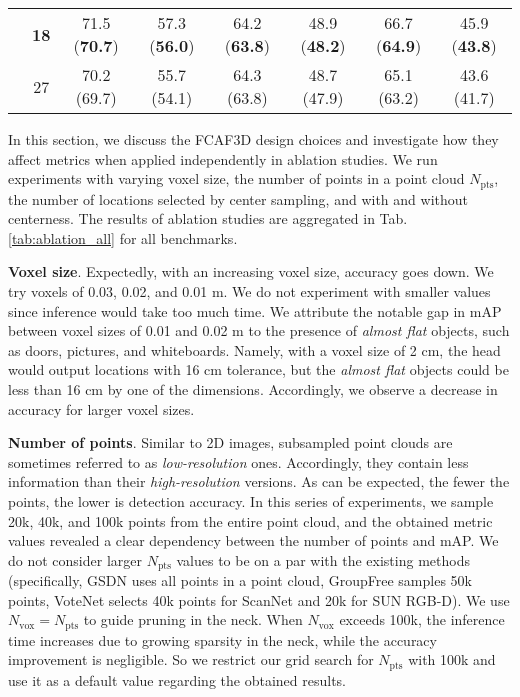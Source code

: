 \documentclass[runningheads]{llncs}
\begin{document}
\begin{table*}[ht!]
{\begin{tabular}{c|c|cccccc}
    & \textbf{18} & 71.5 (\textbf{70.7}) & 57.3 (\textbf{56.0}) & 64.2 (\textbf{63.8}) & 48.9 (\textbf{48.2}) & 66.7 (\textbf{64.9}) & 45.9 (\textbf{43.8}) \\
    & 27 & 70.2 (69.7) & 55.7 (54.1) & 64.3 (63.8) & 48.7 (47.9) & 65.1 (63.2) & 43.6 (41.7) \\ \hline
    \end{tabular}
    }
    \caption{Results of ablation studies on the voxel size, the number of points (which equals the number of voxels $N_{\text{vox}}$ in pruning), centerness, and center sampling in FCAF3D. The better options are marked bold (actually, these are the default options used to obtain the results in Tab. \ref{tab:results} above). The reported metric value is the best across 25 trials; the average value is given in brackets.}
    \label{tab:ablation_all}
\end{table*}

In this section, we discuss the FCAF3D design choices and investigate how they affect metrics when applied independently in ablation studies. We run experiments with varying voxel size, the number of points in a point cloud $N_\text{pts}$, the number of locations selected by center sampling, and with and without centerness. The results of ablation studies are aggregated in Tab. \ref{tab:ablation_all} for all benchmarks.

\textbf{Voxel size}. Expectedly, with an increasing voxel size, accuracy goes down. We try voxels of 0.03, 0.02, and 0.01 m. We do not experiment with smaller values since inference would take too much time. We attribute the notable gap in mAP between voxel sizes of 0.01 and 0.02 m to the presence of \textit{almost flat} objects, such as doors, pictures, and whiteboards. Namely, with a voxel size of 2 cm, the head would output locations with 16 cm tolerance, but the \textit{almost flat} objects could be less than 16 cm by one of the dimensions. Accordingly, we observe a decrease in accuracy for larger voxel sizes.

\textbf{Number of points}. Similar to 2D images, subsampled point clouds are sometimes referred to as \textit{low-resolution} ones. Accordingly, they contain less information than their \textit{high-resolution} versions. As can be expected, the fewer the points, the lower is detection accuracy. In this series of experiments, we sample 20k, 40k, and 100k points from the entire point cloud, and the obtained metric values revealed a clear dependency between the number of points and mAP. We do not consider larger $N_\text{pts}$ values to be on a par with the existing methods (specifically, GSDN \cite{gwak2020gsdn} uses all points in a point cloud, GroupFree \cite{liu2021group-free} samples 50k points, VoteNet \cite{qi2019votenet} selects 40k points for ScanNet and 20k for SUN RGB-D). We use $N_\text{vox} = N_\text{pts}$ to guide pruning in the neck. When $N_\text{vox}$ exceeds 100k, the inference time increases due to growing sparsity in the neck, while the accuracy improvement is negligible. So we restrict our grid search for $N_\text{pts}$ with 100k and use it as a default value regarding the obtained results.
\end{document}
